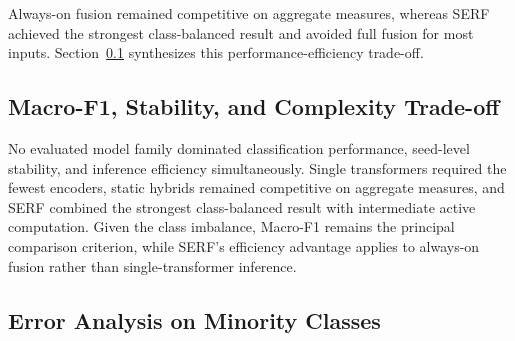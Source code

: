 \documentclass[runningheads]{llncs}
\begin{document}
\begin{table}[!h]
\caption{Comparison with static hybrid models.}\label{tab:static-hybrid-comparison}
\centering
\setlength{\tabcolsep}{4pt}
\scriptsize
{}
\end{table}

Always-on fusion remained competitive on aggregate measures, whereas SERF achieved the strongest class-balanced result and avoided full fusion for most inputs. Section~\ref{sec:tradeoff} synthesizes this performance-efficiency trade-off.

\subsection{Macro-F1, Stability, and Complexity Trade-off}\label{sec:tradeoff}

No evaluated model family dominated classification performance, seed-level stability, and inference efficiency simultaneously. Single transformers required the fewest encoders, static hybrids remained competitive on aggregate measures, and SERF combined the strongest class-balanced result with intermediate active computation. Given the class imbalance, Macro-F1 remains the principal comparison criterion, while SERF's efficiency advantage applies to always-on fusion rather than single-transformer inference.

\subsection{Error Analysis on Minority Classes}\label{sec:minority-error-analysis}
\end{document}
